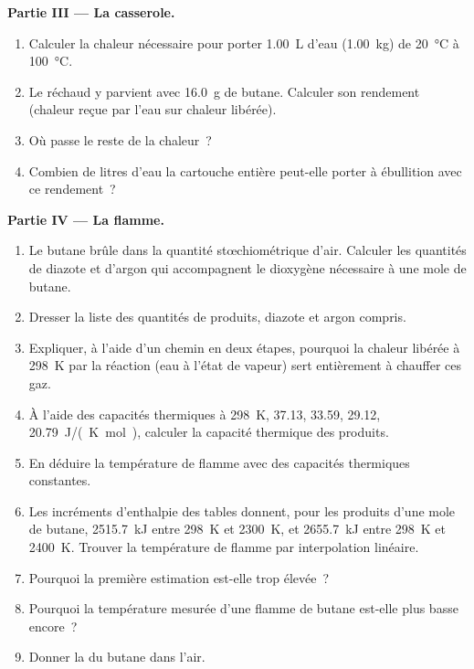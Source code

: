 \begin{problem}
\medskip
\noindent\textbf{Partie III --- La casserole.}
\begin{enumerate}[resume]
  \item Calculer la chaleur nécessaire pour porter \qty{1.00}{L} d'eau
        (\qty{1.00}{kg}) de \qty{20}{\celsius} à \qty{100}{\celsius}.
  \item Le réchaud y parvient avec \qty{16.0}{g} de butane. Calculer son
        rendement (chaleur reçue par l'eau sur chaleur libérée).
  \item Où passe le reste de la chaleur~?
  \item Combien de litres d'eau la cartouche entière peut-elle porter à ébullition
        avec ce rendement~?
\end{enumerate}

\medskip
\noindent\textbf{Partie IV --- La flamme.}
\begin{enumerate}[resume]
  \item Le butane brûle dans la quantité stœchiométrique d'air. Calculer les
        quantités de diazote et d'argon qui accompagnent le dioxygène nécessaire
        à une mole de butane.
  \item Dresser la liste des quantités de produits, diazote et argon compris.
  \item Expliquer, à l'aide d'un chemin en deux étapes, pourquoi la chaleur libérée à
        \qty{298}{K} par la réaction (eau à l'état de vapeur) sert entièrement à
        chauffer ces gaz.
  \item À l'aide des capacités thermiques à \qty{298}{K},  37.13,
         33.59,  29.12,  \qty{20.79}{J/(K.mol)},
        calculer la capacité thermique des produits.
  \item En déduire la température de flamme avec des capacités thermiques constantes.
  \item Les incréments d'enthalpie des tables donnent, pour les produits d'une
        mole de butane, \qty{2515.7}{kJ} entre \qty{298}{K} et
        \qty{2300}{K}, et \qty{2655.7}{kJ} entre \qty{298}{K} et
        \qty{2400}{K}. Trouver la température de flamme par interpolation linéaire.
  \item Pourquoi la première estimation est-elle trop élevée~?
  \item Pourquoi la température mesurée d'une flamme de butane est-elle plus basse encore~?
  \item Donner la  du butane dans l'air.
\end{enumerate}
\end{problem}
